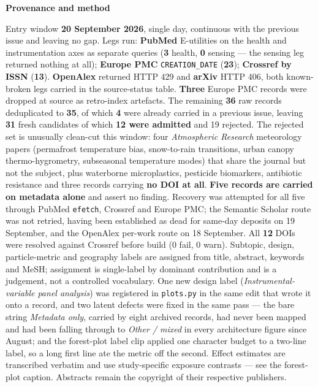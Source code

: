 \documentclass[10pt]{article}
\begin{document}


\vspace{4mm}
\begin{keybox}
{\sffamily\bfseries\footnotesize\color{Deep}Provenance and method}\\[1.2mm]
{\fontsize{7.2}{8.8}\selectfont
Entry window \textbf{20 September 2026}, single day, continuous with the previous issue and
leaving no gap. Legs run: \textbf{PubMed} E-utilities on the health and instrumentation
axes as separate queries (\textbf{3} health, \textbf{0} sensing --- the sensing leg
returned nothing at all); \textbf{Europe PMC} \texttt{CREATION\_DATE} (\textbf{23});
\textbf{Crossref by ISSN} (\textbf{13}). \textbf{OpenAlex} returned HTTP 429 and
\textbf{arXiv} HTTP 406, both known-broken legs carried in the source-status table.
\textbf{Three} Europe PMC records were dropped at source as retro-index artefacts.
The remaining \textbf{36} raw records deduplicated to \textbf{35}, of which \textbf{4} were
already carried in a previous issue, leaving \textbf{31} fresh candidates of which
\textbf{12 were admitted} and 19 rejected. The rejected set is unusually clean-cut this
window: four \textit{Atmospheric Research} meteorology papers (permafrost temperature bias,
snow-to-rain transitions, urban canopy thermo-hygrometry, subseasonal temperature modes)
that share the journal but not the subject, plus waterborne microplastics, pesticide
biomarkers, antibiotic resistance and three records carrying \textbf{no DOI at all}.
\textbf{Five records are carried on metadata alone} and assert no finding. Recovery was
attempted for all five through PubMed \texttt{efetch}, Crossref and Europe PMC; the
Semantic Scholar route was not retried, having been established as dead for same-day
deposits on 19 September, and the OpenAlex per-work route on 18 September. All \textbf{12}
DOIs were resolved against Crossref before build (0 fail, 0 warn).
Subtopic, design, particle-metric and geography labels are assigned from title, abstract,
keywords and MeSH; assignment is single-label by dominant contribution and is a judgement,
not a controlled vocabulary. One new design label (\textit{Instrumental-variable panel
analysis}) was registered in \texttt{plots.py} in the same edit that wrote it onto a
record, and two latent defects were fixed in the same pass --- the bare string
\textit{Metadata only}, carried by eight archived records, had never been mapped and had
been falling through to \textit{Other / mixed} in every architecture figure since August;
and the forest-plot label clip applied one character budget to a two-line label, so a long
first line ate the metric off the second. Effect estimates are transcribed verbatim and
use study-specific exposure contrasts --- see the forest-plot caption. Abstracts remain the
copyright of their respective publishers.\par}
\end{keybox}
\end{document}
